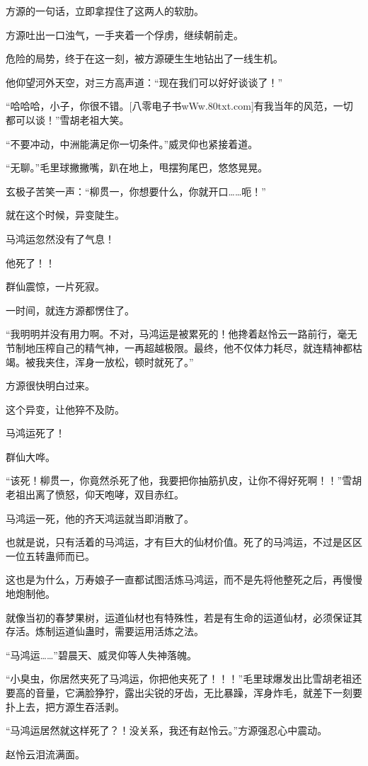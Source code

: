 \begin{this_body}
方源的一句话，立即拿捏住了这两人的软肋。

方源吐出一口浊气，一手夹着一个俘虏，继续朝前走。

危险的局势，终于在这一刻，被方源硬生生地钻出了一线生机。

他仰望河外天空，对三方高声道：“现在我们可以好好谈谈了！”

“哈哈哈，小子，你很不错。[八零电子书wWw.80txt.com]有我当年的风范，一切都可以谈！”雪胡老祖大笑。

“不要冲动，中洲能满足你一切条件。”威灵仰也紧接着道。

“无聊。”毛里球撇撇嘴，趴在地上，甩摆狗尾巴，悠悠晃晃。

玄极子苦笑一声：“柳贯一，你想要什么，你就开口……呃！”

就在这个时候，异变陡生。

马鸿运忽然没有了气息！

他死了！！

群仙震惊，一片死寂。

一时间，就连方源都愣住了。

“我明明并没有用力啊。不对，马鸿运是被累死的！他搀着赵怜云一路前行，毫无节制地压榨自己的精气神，一再超越极限。最终，他不仅体力耗尽，就连精神都枯竭。被我夹住，浑身一放松，顿时就死了。”

方源很快明白过来。

这个异变，让他猝不及防。

马鸿运死了！

群仙大哗。

“该死！柳贯一，你竟然杀死了他，我要把你抽筋扒皮，让你不得好死啊！！”雪胡老祖出离了愤怒，仰天咆哮，双目赤红。

马鸿运一死，他的齐天鸿运就当即消散了。

也就是说，只有活着的马鸿运，才有巨大的仙材价值。死了的马鸿运，不过是区区一位五转蛊师而已。

这也是为什么，万寿娘子一直都试图活炼马鸿运，而不是先将他整死之后，再慢慢地炮制他。

就像当初的春梦果树，运道仙材也有特殊性，若是有生命的运道仙材，必须保证其存活。炼制运道仙蛊时，需要运用活炼之法。

“马鸿运……”碧晨天、威灵仰等人失神落魄。

“小臭虫，你居然夹死了马鸿运，你把他夹死了！！！”毛里球爆发出比雪胡老祖还要高的音量，它满脸狰狞，露出尖锐的牙齿，无比暴躁，浑身炸毛，就差下一刻要扑上去，把方源生吞活剥。

“马鸿运居然就这样死了？！没关系，我还有赵怜云。”方源强忍心中震动。

赵怜云泪流满面。


\end{this_body}
